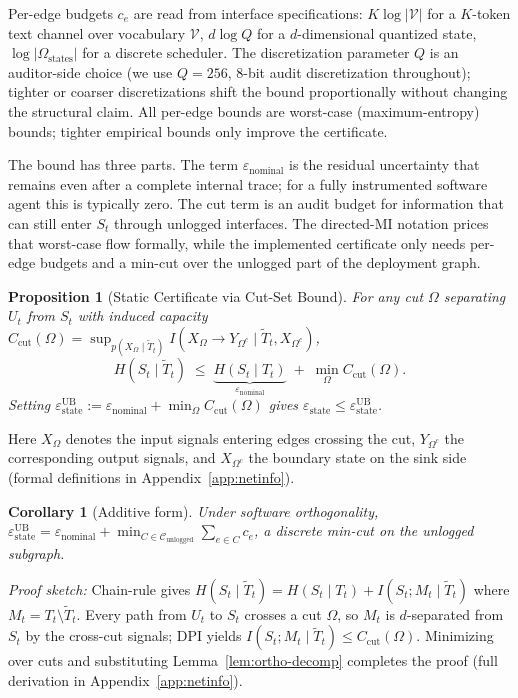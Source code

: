\documentclass{article}
\newtheorem{proposition}{Proposition}
\newtheorem{corollary}{Corollary}
\begin{document}
Per-edge budgets $c_e$ are read from interface specifications: $K \log |\mathcal{V}|$ for a $K$-token text channel over vocabulary $\mathcal{V}$, $d \log Q$ for a $d$-dimensional quantized state, $\log |\Omega_\text{states}|$ for a discrete scheduler. The discretization parameter $Q$ is an auditor-side choice (we use $Q=256$, 8-bit audit discretization throughout); tighter or coarser discretizations shift the bound proportionally without changing the structural claim. All per-edge bounds are worst-case (maximum-entropy) bounds; tighter empirical bounds only improve the certificate.

The bound has three parts. The term $\varepsilon_\text{nominal}$ is the residual uncertainty that remains even after a complete internal trace; for a fully instrumented software agent this is typically zero. The cut term is an audit budget for information that can still enter $S_t$ through unlogged interfaces. The directed-MI notation prices that worst-case flow formally, while the implemented certificate only needs per-edge budgets and a min-cut over the unlogged part of the deployment graph.

\begin{proposition}[Static Certificate via Cut-Set Bound]
\label{prop:static-ub}
For any cut $\Omega$ separating $U_t$ from $S_t$ with induced capacity $C_\text{cut}(\Omega) = \sup_{p(X_\Omega \mid \tilde T_t)} I(X_\Omega \to Y_{\Omega^c} \mid \tilde T_t, X_{\Omega^c})$,
\[
  H(S_t \mid \tilde T_t) \;\leq\; \underbrace{H(S_t \mid T_t)}_{\varepsilon_\text{nominal}} \;+\; \min_{\Omega} C_\text{cut}(\Omega).
\]
Setting $\varepsilon_\text{state}^\text{UB} := \varepsilon_\text{nominal} + \min_\Omega C_\text{cut}(\Omega)$ gives $\varepsilon_\text{state} \leq \varepsilon_\text{state}^\text{UB}$.
\end{proposition}

Here $X_\Omega$ denotes the input signals entering edges crossing the cut, $Y_{\Omega^c}$ the corresponding output signals, and $X_{\Omega^c}$ the boundary state on the sink side (formal definitions in Appendix~\ref{app:netinfo}).

\begin{corollary}[Additive form]
\label{cor:additive-ub}
Under software orthogonality, $\varepsilon_\text{state}^\text{UB} = \varepsilon_\text{nominal} + \min_{C \in \mathcal{C}_\text{unlogged}} \sum_{e \in C} c_e$, a discrete min-cut on the unlogged subgraph.
\end{corollary}

\emph{Proof sketch:} Chain-rule gives $H(S_t \mid \tilde T_t) = H(S_t \mid T_t) + I(S_t; M_t \mid \tilde T_t)$ where $M_t = T_t \setminus \tilde T_t$. Every path from $U_t$ to $S_t$ crosses a cut $\Omega$, so $M_t$ is $d$-separated from $S_t$ by the cross-cut signals; DPI yields $I(S_t; M_t \mid \tilde T_t) \leq C_\text{cut}(\Omega)$. Minimizing over cuts and substituting Lemma~\ref{lem:ortho-decomp} completes the proof (full derivation in Appendix~\ref{app:netinfo}).
\end{document}
